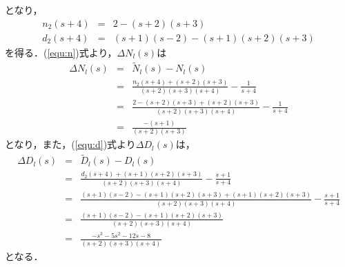 \documentclass[a4paper,12pt]{jarticle}
\begin{document}
%
となり，
%
\begin{eqnarray}
 n_2 (s+4) &=& 2-(s+2)(s+3) \\
 d_2 (s+4) &=& (s+1)(s-2)-(s+1)(s+2)(s+3)
\end{eqnarray}
%
を得る．(\ref{equ:n})式より，$\Delta N_l(s)$は
%
\begin{eqnarray}
 \Delta N_l(s) &=& \tilde{N}_l(s) -N_l(s) \nonumber \\
 &=&\frac{n_2(s+4)+(s+2)(s+3)}{(s+2)(s+3)(s+4)} - \frac{1}{s+4} \nonumber \\
 &=&\frac{2-(s+2)(s+3)+(s+2)(s+3)}{(s+2)(s+3)(s+4)} - \frac{1}{s+4} \nonumber \\
 &=&\frac{-(s+1)}{(s+2)(s+3)}
\end{eqnarray}
%
となり，また，(\ref{equ:d})式より$\Delta D_l(s)$は，
%
\begin{eqnarray}
 \Delta D_l(s) &=& \tilde{D}_l(s) -D_l(s) \nonumber\\
  &=&\frac{d_2(s+4)+(s+1)(s+2)(s+3)}{(s+2)(s+3)(s+4)} -\frac{s+1}{s+4} \nonumber\\
 &=& \frac{(s+1)(s-2)-(s+1)(s+2)(s+3)+(s+1)(s+2)(s+3)}{(s+2)(s+3)(s+4)}
  -\frac{s+1}{s+4} \nonumber\\
 &=&\frac{(s+1)(s-2)-(s+1)(s+2)(s+3)}{(s+2)(s+3)(s+4)} \nonumber\\
 &=&\frac{-s^3-5s^2-12s-8}{(s+2)(s+3)(s+4)}
\end{eqnarray}
%
となる．
\end{document}
